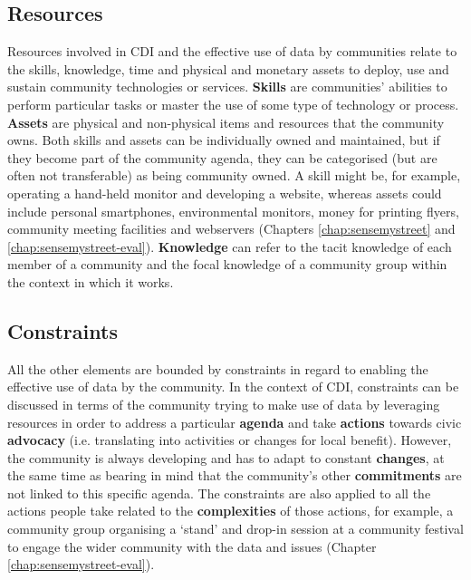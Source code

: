 \subsection{Resources}
Resources involved in CDI and the effective use of data by communities relate to the skills, knowledge, time and physical and monetary assets to deploy, use and sustain community technologies or services. \textbf{Skills} are communities' abilities to perform particular tasks or master the use of some type of technology or process. \textbf{Assets} are physical and non-physical items and resources that the community owns. Both skills and assets can be individually owned and maintained, but if they become part of the community agenda, they can be categorised (but are often not transferable) as being community owned. A skill might be, for example, operating a hand-held monitor and developing a website, whereas assets could include personal smartphones, environmental monitors, money for printing flyers, community meeting facilities and webservers (Chapters \ref{chap:sensemystreet} and \ref{chap:sensemystreet-eval}). \textbf{Knowledge} can refer to the tacit knowledge of each member of a community and the focal knowledge of a community group within the context in which it works.

\subsection{Constraints}
All the other elements are bounded by constraints in regard to enabling the effective use of data by the community. In the context of CDI, constraints can be discussed in terms of the community trying to make use of data by leveraging resources in order to address a particular \textbf{agenda} and take \textbf{actions} towards civic \textbf{advocacy} (i.e. translating into activities or changes for local benefit). However, the community is always developing and has to adapt to constant \textbf{changes}, at the same time as bearing in mind that the community's other \textbf{commitments} are not linked to this specific agenda. The constraints are also applied to all the actions people take related to the \textbf{complexities} of those actions, for example, a community group organising a `stand' and drop-in session at a community festival to engage the wider community with the data and issues (Chapter \ref{chap:sensemystreet-eval}).

